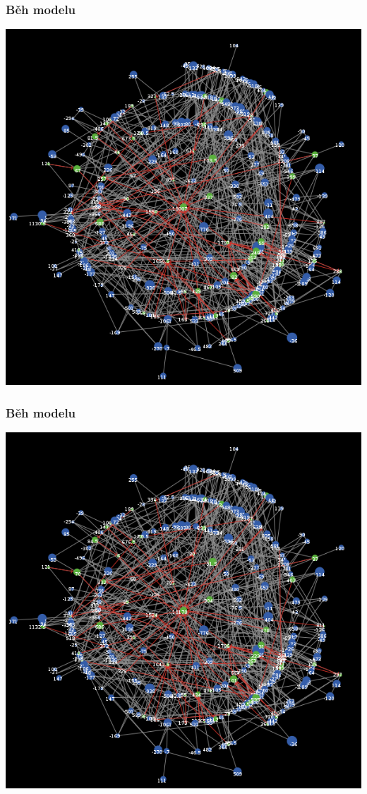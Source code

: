 \documentclass[xcolor=dvipsnames]{beamer}
\begin{document}
    \begin{frame}
    \frametitle{Běh modelu}
    \includegraphics[width=0.6\paperwidth]{22.png}
  \end{frame}
  \begin{frame}
    \frametitle{Běh modelu}
    \includegraphics[width=0.6\paperwidth]{23.png}
  \end{frame}
\end{document}
